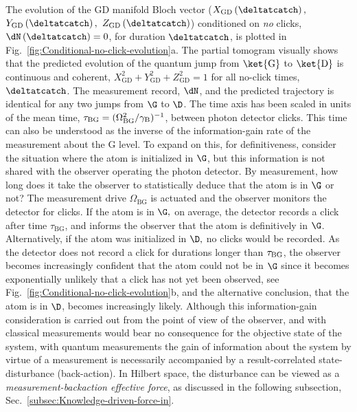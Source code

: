 The evolution of the GD manifold Bloch vector ($X_{\mathrm{GD}}\left(\deltatcatch\right),$
$Y_{\mathrm{GD}}\left(\deltatcatch\right),$ $Z_{\mathrm{GD}}\left(\deltatcatch\right)$)
conditioned on \emph{no }clicks, $\dN\left(\deltatcatch\right)=0$,
for duration $\deltatcatch$, is plotted in Fig.~\ref{fig:Conditional-no-click-evolution}a.
The partial tomogram visually shows that the predicted evolution of
the quantum jump from $\ket{\mathrm{G}}$ to $\ket{\mathrm{D}}$ is
continuous and coherent, $X_{\mathrm{GD}}^{2}+Y_{\mathrm{GD}}^{2}+Z_{\mathrm{GD}}^{2}=1$
for all no-click times, $\deltatcatch$. The measurement record, $\dN$,
and the predicted trajectory is identical for any two jumps from $\G$
to $\D$. The time axis has been scaled in units of the mean time,
$\tau_{\mathrm{BG}}=(\Omega_{{\rm BG}}^{2}/\gamma_{\mathrm{B}})^{-1}$,
between photon detector clicks. This time can also be understood as
the inverse of the information-gain rate of the measurement about
the G level. To expand on this, for definitiveness, consider the situation
where the atom is initialized in $\G$, but this information is not
shared with the observer operating the photon detector. By measurement,
how long does it take the observer to statistically deduce that the
atom is in $\G$ or not?  The measurement drive $\Omega_{\mathrm{BG}}$
is actuated and the observer  monitors the detector for clicks. If
the atom is in $\G,$ on average, the detector records a click after
time $\tau_{\mathrm{BG}}$, and informs the observer that the atom
is definitively in $\G$. Alternatively, if the atom was initialized
in $\D,$ no clicks would be recorded. As the detector does not record
a click for durations longer than $\tau_{{\rm BG}}$, the observer
becomes increasingly confident that the atom could not be in $\G$
since it becomes exponentially unlikely that a click has not yet been
observed, see Fig.~\ref{fig:Conditional-no-click-evolution}b, and
the alternative conclusion, that the atom is in $\D$, becomes increasingly
likely. Although this information-gain consideration is carried out
from the point of view of the observer, and with classical measurements
would bear no consequence for the objective state of the system, with
quantum measurements the gain of information about the system by virtue
of a measurement is necessarily accompanied by a result-correlated
state-disturbance (back-action). In Hilbert space, the disturbance
can be viewed as a \emph{measurement-backaction effective force},
as discussed in the following subsection, Sec.~\ref{subsec:Knowledge-driven-force-in}.

